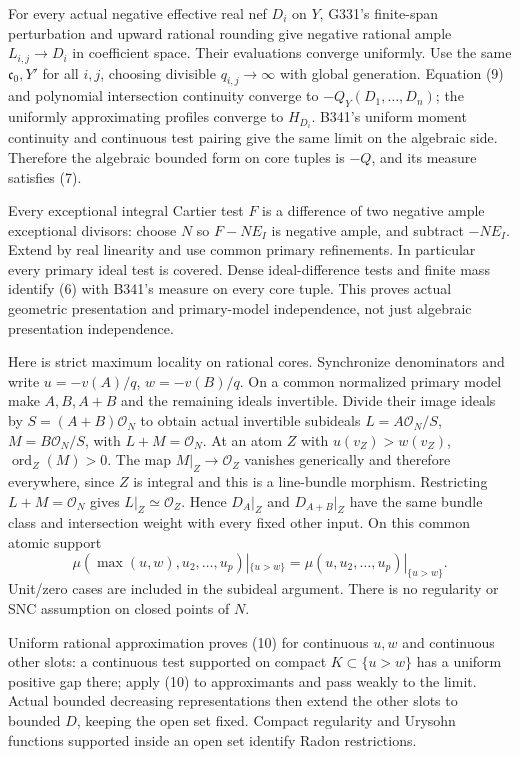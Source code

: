 \documentclass[
  11pt,
]{article}
\begin{document}
For every actual negative effective real nef \(D_i\) on \(Y\), G331's
finite-span perturbation and upward rational rounding give negative
rational ample \(L_{i,j}\to D_i\) in coefficient space. Their
evaluations converge uniformly. Use the same \(\mathfrak c_0,Y'\) for
all \(i,j\), choosing divisible \(q_{i,j}\to\infty\) with global
generation. Equation (9) and polynomial intersection continuity converge
to \(-Q_Y(D_1,\ldots,D_n)\); the uniformly approximating profiles
converge to \(H_{D_i}\). B341's uniform moment continuity and continuous
test pairing give the same limit on the algebraic side. Therefore the
algebraic bounded form on core tuples is \(-Q\), and its measure
satisfies (7).

Every exceptional integral Cartier test \(F\) is a difference of two
negative ample exceptional divisors: choose \(N\) so \(F-NE_I\) is
negative ample, and subtract \(-NE_I\). Extend by real linearity and use
common primary refinements. In particular every primary ideal test is
covered. Dense ideal-difference tests and finite mass identify (6) with
B341's measure on every core tuple. This proves actual geometric
presentation and primary-model independence, not just algebraic
presentation independence.

Here is strict maximum locality on rational cores. Synchronize
denominators and write \(u=-v(A)/q\), \(w=-v(B)/q\). On a common
normalized primary model make \(A,B,A+B\) and the remaining ideals
invertible. Divide their image ideals by \(S=(A+B)\mathcal O_N\) to
obtain actual invertible subideals \(L=A\mathcal O_N/S\),
\(M=B\mathcal O_N/S\), with \(L+M=\mathcal O_N\). At an atom \(Z\) with
\(u(v_Z)>w(v_Z)\), \(\operatorname{ord}_Z(M)>0\). The map
\(M|_Z\to\mathcal O_Z\) vanishes generically and therefore everywhere,
since \(Z\) is integral and this is a line-bundle morphism. Restricting
\(L+M=\mathcal O_N\) gives \(L|_Z\simeq\mathcal O_Z\). Hence \(D_A|_Z\)
and \(D_{A+B}|_Z\) have the same bundle class and intersection weight
with every fixed other input. On this common atomic support
\[\mu(\max(u,w),u_2,\ldots,u_p)|_{\{u>w\}}=\mu(u,u_2,\ldots,u_p)|_{\{u>w\}}.\tag{10}\]
Unit/zero cases are included in the subideal argument. There is no
regularity or SNC assumption on closed points of \(N\).

Uniform rational approximation proves (10) for continuous \(u,w\) and
continuous other slots: a continuous test supported on compact
\(K\subset\{u>w\}\) has a uniform positive gap there; apply (10) to
approximants and pass weakly to the limit. Actual bounded decreasing
representations then extend the other slots to bounded \(D\), keeping
the open set fixed. Compact regularity and Urysohn functions supported
inside an open set identify Radon restrictions.
\end{document}
